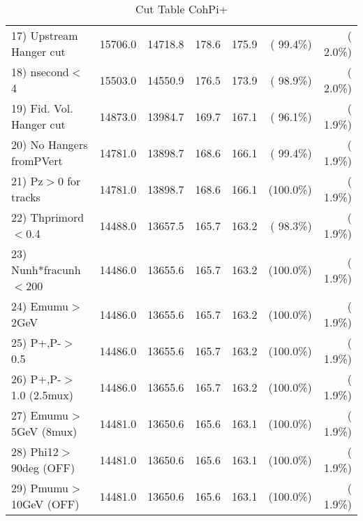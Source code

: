 \begin{table}[h!]
\begin{tabular}{||l||r|r|r|r|r|r||}
 17) Upstream Hanger cut  &      15706.0 &      14718.8 &        178.6 &        175.9 & ( 99.4\%) & (  2.0\%) \\
 18) nsecond$<$4          &      15503.0 &      14550.9 &        176.5 &        173.9 & ( 98.9\%) & (  2.0\%) \\
 19) Fid. Vol. Hanger cut &      14873.0 &      13984.7 &        169.7 &        167.1 & ( 96.1\%) & (  1.9\%) \\
 20) No Hangers fromPVert &      14781.0 &      13898.7 &        168.6 &        166.1 & ( 99.4\%) & (  1.9\%) \\
 21) Pz$>$0 for tracks    &      14781.0 &      13898.7 &        168.6 &        166.1 & (100.0\%) & (  1.9\%) \\
 22) Thprimord$<$0.4      &      14488.0 &      13657.5 &        165.7 &        163.2 & ( 98.3\%) & (  1.9\%) \\
 23) Nunh*fracunh$<$200   &      14486.0 &      13655.6 &        165.7 &        163.2 & (100.0\%) & (  1.9\%) \\
 24) Emumu$>$2GeV         &      14486.0 &      13655.6 &        165.7 &        163.2 & (100.0\%) & (  1.9\%) \\
 25) P+,P-$>$0.5          &      14486.0 &      13655.6 &        165.7 &        163.2 & (100.0\%) & (  1.9\%) \\
 26) P+,P-$>$1.0 (2.5mux) &      14486.0 &      13655.6 &        165.7 &        163.2 & (100.0\%) & (  1.9\%) \\
 27) Emumu$>$5GeV  (8mux) &      14481.0 &      13650.6 &        165.6 &        163.1 & (100.0\%) & (  1.9\%) \\
 28) Phi12$>$90deg  (OFF) &      14481.0 &      13650.6 &        165.6 &        163.1 & (100.0\%) & (  1.9\%) \\
 29) Pmumu$>$10GeV  (OFF) &      14481.0 &      13650.6 &        165.6 &        163.1 & (100.0\%) & (  1.9\%) \\
 \hline
 \hline
 \end{tabular}
 \caption{Cut Table  CohPi+   }
 \label{tab-cutcohjpsi-mumu_cohpip}
 \end{table}
